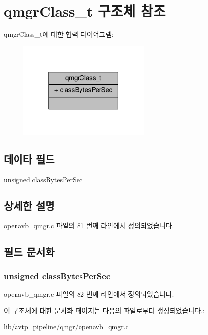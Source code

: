 \hypertarget{structqmgr_class__t}{}\section{qmgr\+Class\+\_\+t 구조체 참조}
\label{structqmgr_class__t}


qmgr\+Class\+\_\+t에 대한 협력 다이어그램\+:
\nopagebreak
\begin{figure}[H]
\begin{center}
\leavevmode
\includegraphics[width=187pt]{structqmgr_class__t__coll__graph}
\end{center}
\end{figure}
\subsection*{데이타 필드}
\begin{DoxyCompactItemize}
\item 
unsigned \hyperlink{structqmgr_class__t_a72dcfa242cf7919ce0eec71820685ca1}{class\+Bytes\+Per\+Sec}
\end{DoxyCompactItemize}


\subsection{상세한 설명}


openavb\+\_\+qmgr.\+c 파일의 81 번째 라인에서 정의되었습니다.



\subsection{필드 문서화}
\subsubsection[{\texorpdfstring{class\+Bytes\+Per\+Sec}{classBytesPerSec}}]{\setlength{\rightskip}{0pt plus 5cm}unsigned class\+Bytes\+Per\+Sec}\hypertarget{structqmgr_class__t_a72dcfa242cf7919ce0eec71820685ca1}{}\label{structqmgr_class__t_a72dcfa242cf7919ce0eec71820685ca1}


openavb\+\_\+qmgr.\+c 파일의 82 번째 라인에서 정의되었습니다.



이 구조체에 대한 문서화 페이지는 다음의 파일로부터 생성되었습니다.\+:\begin{DoxyCompactItemize}
\item 
lib/avtp\+\_\+pipeline/qmgr/\hyperlink{openavb__qmgr_8c}{openavb\+\_\+qmgr.\+c}\end{DoxyCompactItemize}

